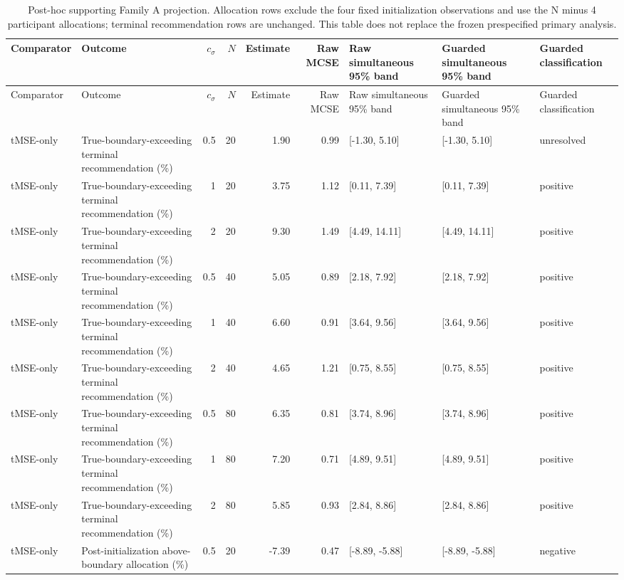 \begin{longtable}{p{1.8cm}p{3.0cm}rrrrp{2.6cm}p{2.6cm}p{1.6cm}}
\caption{Post-hoc supporting Family A projection. Allocation rows exclude the four fixed initialization observations and use the N minus 4 participant allocations; terminal recommendation rows are unchanged. This table does not replace the frozen prespecified primary analysis.}\label{tab:budget-toxicity-calibration-family-a-post-initialization}\\
\toprule
Comparator & Outcome & $c_\sigma$ & $N$ & Estimate & Raw MCSE & Raw simultaneous 95\% band & Guarded simultaneous 95\% band & Guarded classification \\
\midrule
\endfirsthead
\toprule
Comparator & Outcome & $c_\sigma$ & $N$ & Estimate & Raw MCSE & Raw simultaneous 95\% band & Guarded simultaneous 95\% band & Guarded classification \\
\midrule
\endhead
tMSE-only & True-boundary-exceeding terminal recommendation (\%) & 0.5 & 20 & 1.90 & 0.99 & [-1.30, 5.10] & [-1.30, 5.10] & unresolved \\
tMSE-only & True-boundary-exceeding terminal recommendation (\%) & 1 & 20 & 3.75 & 1.12 & [0.11, 7.39] & [0.11, 7.39] & positive \\
tMSE-only & True-boundary-exceeding terminal recommendation (\%) & 2 & 20 & 9.30 & 1.49 & [4.49, 14.11] & [4.49, 14.11] & positive \\
tMSE-only & True-boundary-exceeding terminal recommendation (\%) & 0.5 & 40 & 5.05 & 0.89 & [2.18, 7.92] & [2.18, 7.92] & positive \\
tMSE-only & True-boundary-exceeding terminal recommendation (\%) & 1 & 40 & 6.60 & 0.91 & [3.64, 9.56] & [3.64, 9.56] & positive \\
tMSE-only & True-boundary-exceeding terminal recommendation (\%) & 2 & 40 & 4.65 & 1.21 & [0.75, 8.55] & [0.75, 8.55] & positive \\
tMSE-only & True-boundary-exceeding terminal recommendation (\%) & 0.5 & 80 & 6.35 & 0.81 & [3.74, 8.96] & [3.74, 8.96] & positive \\
tMSE-only & True-boundary-exceeding terminal recommendation (\%) & 1 & 80 & 7.20 & 0.71 & [4.89, 9.51] & [4.89, 9.51] & positive \\
tMSE-only & True-boundary-exceeding terminal recommendation (\%) & 2 & 80 & 5.85 & 0.93 & [2.84, 8.86] & [2.84, 8.86] & positive \\
tMSE-only & Post-initialization above-boundary allocation (\%) & 0.5 & 20 & -7.39 & 0.47 & [-8.89, -5.88] & [-8.89, -5.88] & negative \\

\end{longtable}
